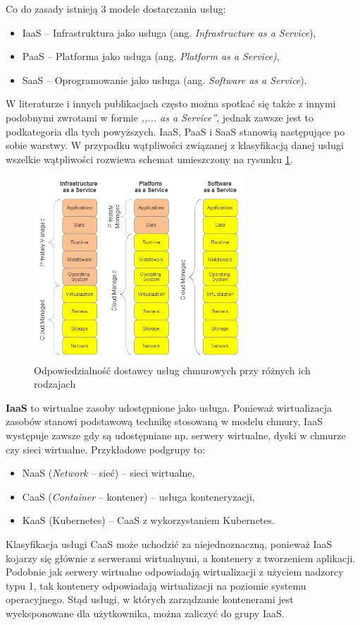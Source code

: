 \documentclass[12pt,a4paper,twoside,titlepage,openright]{book}
\begin{document}
Co do zasady istnieją 3 modele dostarczania usług:
\begin{itemize}
\item IaaS -- Infrastruktura jako usługa (ang. \textit{Infrastructure as a Service}),
\item PaaS -- Platforma jako usługa (ang. \textit{Platform as a Service)},
\item SaaS -- Oprogramowanie jako usługa (ang. \textit{Software as a Service}).
\end{itemize}
W literaturze i innych publikacjach często można spotkać się także z innymi podobnymi zwrotami w formie \textit{,,... as a Service''}, jednak zawsze jest to podkategoria dla tych powyższych. IaaS, PaaS i SaaS stanowią następujące po sobie warstwy. W przypadku wątpliwości związanej z klasyfikacją danej usługi wszelkie wątpliwości rozwiewa schemat umieszczony na rysunku \ref{fig:iaas-paas-saas}.

\begin{figure}[h]
	\centering
			\includegraphics[width=0.7\textwidth]{iaas-paas-saas.png}
		\caption{Odpowiedzialność dostawcy usług chmurowych przy różnych ich rodzajach \cite{iotArchitects}}
		\label{fig:iaas-paas-saas}
\end{figure}

\textbf{IaaS} to wirtualne zasoby udostępnione jako usługa. Ponieważ wirtualizacja zasobów stanowi podstawową technikę stosowaną w modelu chmury, IaaS występuje zawsze gdy są udostępniane np. serwery wirtualne, dyski w chmurze czy sieci wirtualne. Przykładowe podgrupy to:
\begin{itemize}
\item NaaS (\textit{Network} -- sieć) -- sieci wirtualne,
\item CaaS (\textit{Container} -- kontener) -- usługa konteneryzacji,
\item KaaS (Kubernetes) -- CaaS z wykorzystaniem Kubernetes.
\end{itemize}
Klasyfikacja usługi CaaS może uchodzić za niejednoznaczną, ponieważ IaaS kojarzy się głównie z serwerami wirtualnymi, a kontenery z tworzeniem aplikacji. Podobnie jak serwery wirtualne odpowiadają wirtualizacji z użyciem nadzorcy typu 1, tak kontenery odpowiadają wirtualizacji na poziomie systemu operacyjnego. Stąd usługi, w których zarządzanie kontenerami jest wyeksponowane dla użytkownika, można zaliczyć do grupy IaaS.
\end{document}
